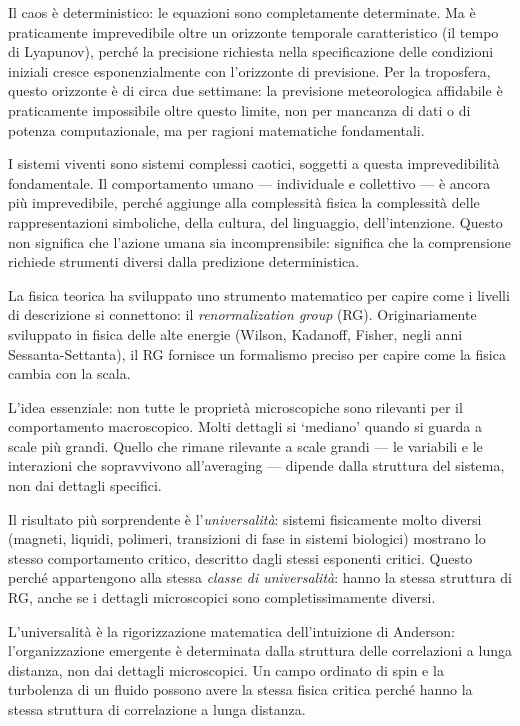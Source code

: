 \documentclass[12pt,a4paper,openany]{book}
\newcommand{\sezione}[1]{\vspace{1.2em}{\large\bfseries #1}\vspace{0.5em}\par}
\begin{document}
Il caos è deterministico: le equazioni sono completamente determinate. Ma è praticamente imprevedibile oltre un orizzonte temporale caratteristico (il tempo di Lyapunov), perché la precisione richiesta nella specificazione delle condizioni iniziali cresce esponenzialmente con l'orizzonte di previsione. Per la troposfera, questo orizzonte è di circa due settimane: la previsione meteorologica affidabile è praticamente impossibile oltre questo limite, non per mancanza di dati o di potenza computazionale, ma per ragioni matematiche fondamentali.

I sistemi viventi sono sistemi complessi caotici, soggetti a questa imprevedibilità fondamentale. Il comportamento umano — individuale e collettivo — è ancora più imprevedibile, perché aggiunge alla complessità fisica la complessità delle rappresentazioni simboliche, della cultura, del linguaggio, dell'intenzione. Questo non significa che l'azione umana sia incomprensibile: significa che la comprensione richiede strumenti diversi dalla predizione deterministica.

\sezione{Il renormalization group: come i livelli si connettono}

La fisica teorica ha sviluppato uno strumento matematico per capire come i livelli di descrizione si connettono: il \textit{renormalization group} (RG). Originariamente sviluppato in fisica delle alte energie (Wilson, Kadanoff, Fisher, negli anni Sessanta-Settanta), il RG fornisce un formalismo preciso per capire come la fisica cambia con la scala.

L'idea essenziale: non tutte le proprietà microscopiche sono rilevanti per il comportamento macroscopico. Molti dettagli si `mediano' quando si guarda a scale più grandi. Quello che rimane rilevante a scale grandi --- le variabili e le interazioni che sopravvivono all'averaging --- dipende dalla struttura del sistema, non dai dettagli specifici.

Il risultato più sorprendente è l'\textit{universalità}: sistemi fisicamente molto diversi (magneti, liquidi, polimeri, transizioni di fase in sistemi biologici) mostrano lo stesso comportamento critico, descritto dagli stessi esponenti critici. Questo perché appartengono alla stessa \textit{classe di universalità}: hanno la stessa struttura di RG, anche se i dettagli microscopici sono completissimamente diversi.

L'universalità è la rigorizzazione matematica dell'intuizione di Anderson: l'organizzazione emergente è determinata dalla struttura delle correlazioni a lunga distanza, non dai dettagli microscopici. Un campo ordinato di spin e la turbolenza di un fluido possono avere la stessa fisica critica perché hanno la stessa struttura di correlazione a lunga distanza.
\end{document}
